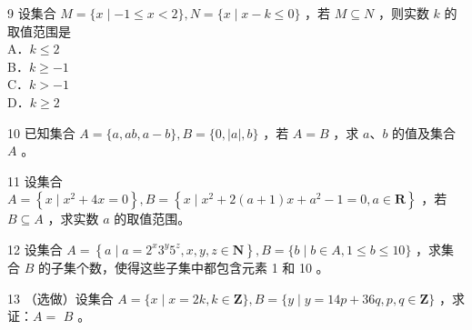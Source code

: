 \documentclass[10pt]{article}
\begin{document}
9 设集合 \(M=\{x \mid-1 \leqslant x<2\}, N=\{x \mid x-k \leqslant 0\}\) ，若 \(M \subseteq N\) ，则实数 \(k\) 的取值范围是\\
A．\(k \leqslant 2\)\\
B．\(k \geqslant-1\)\\
C．\(k>-1\)\\
D．\(k \geqslant 2\)

10 已知集合 \(A=\{a, a b, a-b\}, B=\{0,|a|, b\}\) ，若 \(A=B\) ，求 \(a 、 b\) 的值及集合 \(A\) 。

11 设集合 \(A=\left\{x \mid x^{2}+4 x=0\right\}, B=\left\{x \mid x^{2}+2(a+1) x+a^{2}-1=0, a \in \mathbf{R}\right\}\) ，若 \(B \subseteq A\) ，求实数 \(a\) 的取值范围。

12 设集合 \(A=\left\{a \mid a=2^{x} 3^{y} 5^{z}, x, y, z \in \mathbf{N}\right\}, B=\{b \mid b \in A, 1 \leqslant b \leqslant 10\}\) ，求集合 \(B\) 的子集个数，使得这些子集中都包含元素 1 和 10 。

13 （选做）设集合 \(A=\{x \mid x=2 k, k \in \mathbf{Z}\}, B=\{y \mid y=14 p+36 q, p, q \in \mathbf{Z}\}\) ，求证：\(A=\) \(B\) 。
\end{document}
